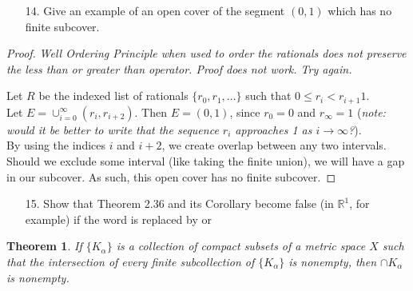 \documentclass[10pt]{article}
\theoremstyle{definition}
\theoremstyle{plain}
\newtheorem*{theorem*}{Theorem}
\newcommand{\N}{\mathbb{N}}
\newcommand{\R}{\mathbb{R}}
\begin{document}




\pagebreak




\begin{enumerate}
\item[14.] Give an example of an open cover of the segment $(0,1)$ which has no finite subcover.
\end{enumerate}

\begin{proof}
\textit{Well Ordering Principle when used to order the rationals does not preserve the less than or greater than operator. Proof does not work. Try again.}

Let $R$ be the indexed list of rationals $\{r_0, r_1, \dots\}$ such that $0\leq r_i < r_{i+1}  1$. \\

Let $E=\cup_{i=0}^\infty (r_i, r_{i+2}).$ Then $E=(0,1)$, since $r_0=0$ and $r_\infty = 1$ (\textit{note: would it be better to write that the sequence $r_i$ approaches 1 as $i\rightarrow\infty$?}). \\

By using the indices $i$ and $i+2$, we create overlap between any two intervals. Should we exclude some interval (like taking the finite union), we will have a gap in our subcover. As such, this open cover has no finite subcover.
\end{proof}




\pagebreak





\begin{enumerate}
\item[15.] Show that Theorem 2.36 and its Corollary become false (in $\R^1$, for example) if the word  is replaced by  or 
\end{enumerate}
\setcounter{equation}{2}
\begin{theorem*}
If $\{K_\alpha\}$ is a collection of compact subsets of a metric space $X$ such that the intersection of every finite subcollection of $\{K_\alpha\}$ is nonempty, then $\cap K_\alpha$ is nonempty.
\end{theorem*}
\end{document}

